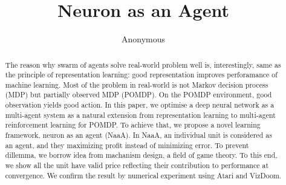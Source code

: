 \documentclass{article} %
\title{Neuron as an Agent}
\author{Anonymous}
\begin{document}
\maketitle

\begin{abstract}
The reason why swarm of agents solve real-world problem well is, interestingly,
same as the principle of representation learning: good representation improves
perforamance of machine learning. Most of the problem in real-world is not
Markov decision process (MDP) but partially observed MDP (POMDP). On the
POMDP environment, good observation yields good action. In this paper, we
optimise a deep neural network as a multi-agent system as a natural extension
from representation learning to multi-agent reinforcement learning for POMDP.
To achieve that, we propose a novel learning framework, neuron as an agent
(NaaA). In NaaA, an individual unit is considered as an agent, and they maximizing
profit instead of minimizing error. To prevent dillemma, we borrow idea
from machanism design, a field of game theory. To this end, we show all the unit
have valid price reflecting their contribution to performance at convergence. We
confirm the result by numerical experiment using Atari and VizDoom.
\end{abstract}











\end{document}
